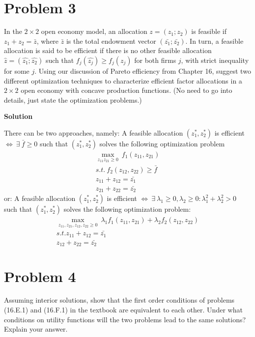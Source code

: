 \documentclass[a4paper]{article}
\begin{document}
\section*{Problem 3}
In the $2\times 2$ open economy model, an allocation $z = (z_1; z_2)$ is feasible if $z_1+z_2 = \bar{z}$, where
$\bar{z}$ is the total endowment vector $(\bar{z_1}; \bar{z_2})$. In turn, a feasible allocation is said to be efficient
if there is no other feasible allocation $\hat{z} = (\hat{z_1}; \hat{z_2})$ such that $f_j(\hat{z_j}) \ge f_j(z_j)$ for both firms $j$,
with strict inequality for some $j$. Using our discussion of Pareto efficiency from Chapter 16,
suggest two different optimization techniques to characterize efficient factor allocations in a
$2 \times 2$ open economy with concave production functions. (No need to go into details, just
state the optimization problems.)



\textbf{Solution}


There can be two approaches, namely:
A feasible allocation $(z_1^*, z_2^*)$ is efficient $\iff\ \exists\ \bar{f} \ge 0$ such that $(z_1^*, z_2^*)$ solves the following optimization problem 
\begin{align*}
\underset{z_{11} z_{21} \ge 0}{\max}\ f_1(z_{11}, z_{21})\\
s.t.\ f_2(z_{12}, z_{22}) \ge \bar{f}\\
z_{11} + z_{12} = \bar{z_1}\\
z_{21} + z_{22} = \bar{z_2}
\end{align*}
or:
A feasible allocation $(z_1^*, z_2^*)$ is efficient $\iff\ \exists\ \lambda_1 \ge 0, \lambda_2 \ge 0: \lambda_1^2 + \lambda_2^2 > 0$ such that $(z_1^*, z_2^*)$ solves the following optimization problem:
\begin{align*}
\underset{z_{11}, z_{21}, z_{12}, z_{22} \ge 0}{\max}\ \lambda_1 f_1(z_{11}, z_{21}) + \lambda_2f_2(z_{12}, z_{22})\\
s.t. z_{11} + z_{12} = \bar{z_1}\\
	z_{12} + z_{22} = \bar{z_2}
\end{align*}
\section*{Problem 4}
Assuming interior solutions, show that the first order conditions of problems (16.E.1)
and (16.F.1) in the textbook are equivalent to each other. Under what conditions on utility
functions will the two problems lead to the same solutions? Explain your answer.
\end{document}
